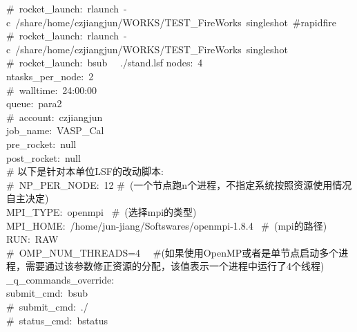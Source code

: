 \documentclass[10pt,a4paper]{article}
\begin{document}
\begin{itemize}
{{		\textrm{\#~rocket\_launch:~rlaunch~-c~/share/home/czjiangjun/WORKS/TEST\_FireWorks~singleshot~#rapidfire}\\
		\textrm{\#~rocket\_launch:~rlaunch~-c~/share/home/czjiangjun/WORKS/TEST\_FireWorks~singleshot}\\ 
		\textrm{\#~rocket\_launch:~bsub ~~./stand.lsf}
		\textrm{nodes:~4}\\
		\textrm{ntasks\_per\_node:~2}\\
		\textrm{\#~walltime:~24:00:00}\\
		\textrm{queue:~para2}\\
		\textrm{\#~account:~czjiangjun}\\
		\textrm{job\_name:~VASP\_Cal}\\
		\textrm{pre\_rocket:~null}\\
		\textrm{post\_rocket:~null}\\
		\# 以下是针对本单位\textrm{LSF}的改动脚本:\\
		\textrm{\#~NP\_PER\_NODE:~12 \#~(一个节点跑\textrm{n}个进程，不指定系统按照资源使用情况自主决定)}\\
		\textrm{MPI\_TYPE:~openmpi ~\#~(选择mpi的类型)}\\
		\textrm{MPI\_HOME:~/home/jun-jiang/Softswares/openmpi-1.8.4 ~\#~(\textrm{mpi}的路径)}\\
		\textrm{RUN:~RAW}\\
		\textrm{\#~OMP\_NUM\_THREADS=4 ~~\#(如果使用\textrm{OpenMP}或者是单节点启动多个进程，需要通过该参数修正资源的分配，该值表示一个进程中运行了4个线程)}\\
		\textrm{\_q\_commands\_override:}\\
		\hspace*{25pt}\textrm{submit\_cmd:~bsub}\\
		\hspace*{25pt}\#~\textrm{submit\_cmd:~./}\\
		\hspace*{25pt}\#~\textrm{status\_cmd:~bstatus}}}
\end{itemize}
\end{document}
